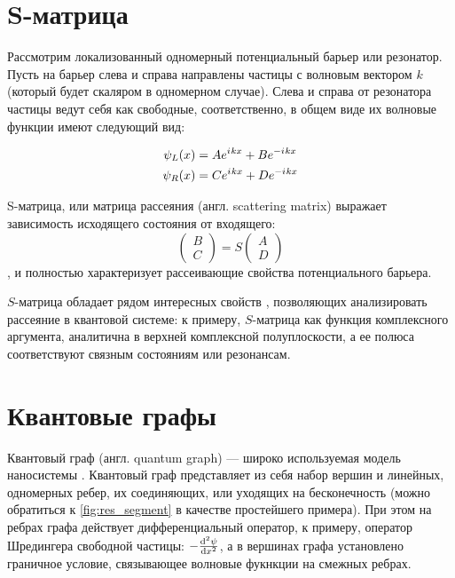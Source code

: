 \section{S-матрица}\label{sec:smatrix}
Рассмотрим локализованный одномерный потенциальный барьер или резонатор. Пусть на барьер слева и справа направлены частицы с волновым вектором $k$ (который будет скаляром в одномерном случае). Слева и справа от резонатора частицы ведут себя как свободные, соответственно, в общем виде их волновые функции имеют следующий вид:

\begin{equation}\label{eq:wlwl}
\begin{aligned}
   \psi_L(x) &= A e^{{i\mkern1mu} k x} + B e^{-{i\mkern1mu} k x}
\\ \psi_R(x) &= C e^{{i\mkern1mu} k x} + D e^{-{i\mkern1mu} k x}
\end{aligned}
\end{equation}

S-матрица, или  матрица рассеяния (англ. scattering matrix) выражает зависимость исходящего состояния от входящего:
\begin{equation}\label{eq:smatrix}
\begin{pmatrix} B \\ C \end{pmatrix} = S \begin{pmatrix} A \\ D \end{pmatrix}
\end{equation}
, и полностью характеризует рассеивающие свойства потенциального барьера.

$S$-матрица обладает рядом интересных свойств \cite[стр. 75]{perelomov1998quantum}, позволяющих анализировать рассеяние в квантовой системе: к примеру, $S$-матрица как функция комплексного аргумента, аналитична в верхней комплексной полуплоскости, а ее полюса соответствуют связным состояниям или резонансам.

\section{Квантовые графы}
Квантовый граф (англ. quantum graph) — широко используемая модель наносистемы \cite{kuchment2002graph, lobanov2013genetic, brown2010analysis}. Квантовый граф представляет из себя набор вершин и линейных, одномерных ребер, их соединяющих, или уходящих на бесконечность (можно обратиться к \autoref{fig:res_segment} в качестве простейшего примера). При этом на ребрах графа действует дифференциальный оператор, к примеру, оператор Шредингера свободной частицы: $-\dv[2]{\psi}{x}$, а в вершинах графа установлено граничное условие, связывающее волновые фукнкции на смежных ребрах.

